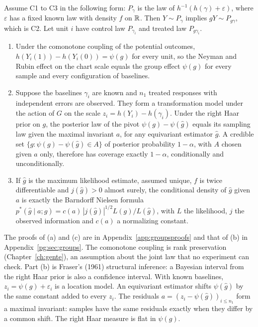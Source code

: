 \begin{theorem}\label{gr:thm:recon}
Assume C1 to C3 in the following form: $P_\gamma$ is the law of $h^{-1}(h(\gamma)+\varepsilon)$, where $\varepsilon$ has a fixed known law with density $f$ on $\mathbb{R}$. Then $Y\sim P_\gamma$ implies $gY\sim P_{g\gamma}$, which is C2. Let unit $i$ have control law $P_{\gamma_i}$ and treated law $P_{g\gamma_i}$.
\begin{enumerate}
\item[(a)] Under the comonotone coupling of the potential outcomes, $h(Y_i(1))-h(Y_i(0))=\psi(g)$ for every unit, so the Neyman and Rubin effect on the chart scale equals the group effect $\psi(g)$ for every sample and every configuration of baselines.
\item[(b)] Suppose the baselines $\gamma_i$ are known and $n_1$ treated responses with independent errors are observed. They form a transformation model under the action of $G$ on the scale $z_i=h(Y_i)-h(\gamma_i)$. Under the right Haar prior on $g$, the posterior law of the pivot $\psi(g)-\psi(\hat g)$ equals its sampling law given the maximal invariant $a$, for any equivariant estimator $\hat g$. A credible set $\{g:\psi(g)-\psi(\hat g)\in A\}$ of posterior probability $1-\alpha$, with $A$ chosen given $a$ only, therefore has coverage exactly $1-\alpha$, conditionally and unconditionally.
\item[(c)] If $\hat g$ is the maximum likelihood estimate, assumed unique, $f$ is twice differentiable and $j(\hat g)>0$ almost surely, the conditional density of $\hat g$ given $a$ is exactly the Barndorff Nielsen formula $p^{*}(\hat g\mid a;g)=c(a)\,|j(\hat g)|^{1/2}L(g)/L(\hat g)$, with $L$ the likelihood, $j$ the observed information and $c(a)$ a normalizing constant.
\end{enumerate}
\end{theorem}

The proofs of (a) and (c) are in Appendix~\ref{app:groupsproofs} and that of (b) in Appendix~\ref{pg:sec:groups}. The comonotone coupling is rank preservation (Chapter~\ref{ch:gente}), an assumption about the joint law that no experiment can check. Part (b) is Fraser's (1961) structural inference: a Bayesian interval from the right Haar prior is also a confidence interval. With known baselines, $z_i=\psi(g)+\varepsilon_i$ is a location model. An equivariant estimator shifts $\psi(\hat g)$ by the same constant added to every $z_i$. The residuals $a=(z_i-\psi(\hat g))_{i\le n_1}$ form a maximal invariant: samples have the same residuals exactly when they differ by a common shift. The right Haar measure is flat in $\psi(g)$.

